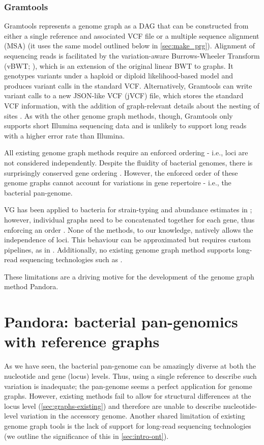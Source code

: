 \subsubsection{Gramtools}
Gramtools \cite{gramtools2016,gramtools2021} represents a genome graph as a DAG that can be constructed from either a single reference and associated VCF file or a multiple sequence alignment (MSA) (it uses the same model outlined below in \autoref{sec:make_prg}). Alignment of sequencing reads is facilitated by the variation-aware Burrows-Wheeler Transform (vBWT; \cite{gramtools2016}), which is an extension of the original linear BWT to graphs. It genotypes variants under a haploid or diploid likelihood-based model and produces variant calls in the standard VCF. Alternatively, Gramtools can write variant calls to a new JSON-like VCF (jVCF) file, which stores the standard VCF information, with the addition of graph-relevant details about the nesting of sites \cite{gramtools2021}. As with the other genome graph methods, though, Gramtools only supports short Illumina sequencing data and is unlikely to support long reads with a higher error rate than Illumina.

\noindent
All existing genome graph methods require an enforced ordering - i.e., loci are not considered independently. Despite the fluidity of bacterial genomes, there is surprisingly conserved gene ordering \cite{Tamames2001,Rocha2008}. However, the enforced order of these genome graphs cannot account for variations in gene repertoire - i.e., the bacterial pan-genome. 

VG has been applied to bacteria for strain-typing and abundance estimates in \ecoli{}; however, individual graphs need to be concatenated together for each gene, thus enforcing an order \cite{strainflair2021}. None of the methods, to our knowledge, natively allows the independence of loci. This behaviour can be approximated but requires custom pipelines, as in \cite{strainflair2021}. Additionally, no existing genome graph method supports long-read sequencing technologies such as \ont{}.

These limitations are a driving motive for the development of the genome graph method Pandora.

\section{Pandora: bacterial pan-genomics with reference graphs}
\label{sec:pandora-intro}

As we have seen, the bacterial pan-genome can be amazingly diverse at both the nucleotide and gene (locus) levels. Thus, using a single reference to describe such variation is inadequate; the pan-genome seems a perfect application for genome graphs. However, existing methods fail to allow for structural differences at the locus level (\autoref{sec:graphs-existing}) and therefore are unable to describe nucleotide-level variation in the accessory genome. Another shared limitation of existing genome graph tools is the lack of support for long-read sequencing technologies (we outline the significance of this in \autoref{sec:intro-ont}).

